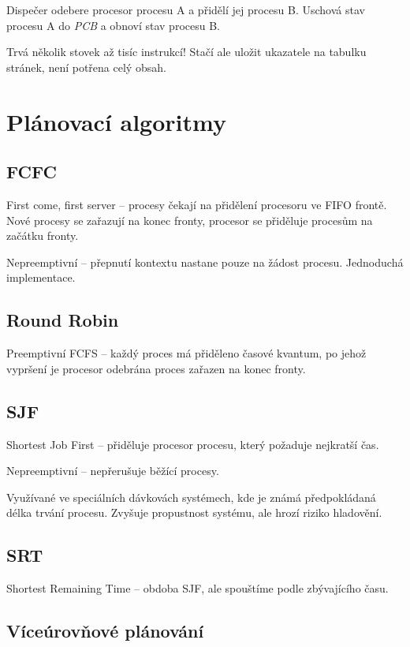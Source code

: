 \documentclass[a4paper, 11pt]{report}
\begin{document}
Dispečer odebere procesor procesu A a přidělí jej procesu B. Uschová stav procesu A do \emph{PCB} a obnoví stav procesu B.

Trvá několik stovek až tisíc instrukcí! Stačí ale uložit ukazatele na tabulku stránek, není potřena celý obsah.

\section{Plánovací algoritmy}

\subsection{FCFC}
First come, first server -- procesy čekají na přidělení procesoru ve FIFO frontě. Nové procesy se zařazují na konec fronty, procesor se přiděluje procesům na začátku fronty.

Nepreemptivní -- přepnutí kontextu nastane pouze na žádost procesu. Jednoduchá implementace.

\subsection{Round Robin}

Preemptivní FCFS -- každý proces má přiděleno časové kvantum, po jehož vypršení je procesor odebrána  proces zařazen na konec fronty.

\subsection{SJF}

Shortest Job First -- přiděluje procesor procesu, který požaduje nejkratší čas.

Nepreemptivní -- nepřerušuje běžící procesy.

Využívané ve speciálních dávkovách systémech, kde je známá předpokládaná délka trvání procesu. Zvyšuje propustnost systému, ale hrozí riziko hladovění.

\subsection{SRT}

Shortest Remaining Time -- obdoba SJF, ale spouštíme podle zbývajícího času.

\subsection{Víceúrovňové plánování}
\end{document}
